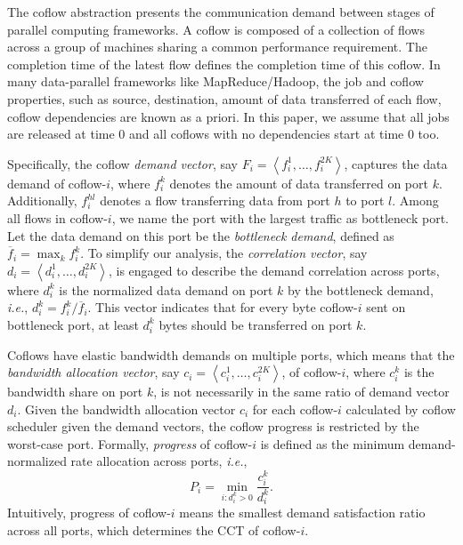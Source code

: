 \documentclass[10pt, conference, letterpaper]{IEEEtran}
\begin{document}
The coflow abstraction presents the communication demand between stages of parallel computing frameworks. A coflow is composed of a collection of flows across a group of machines sharing a common performance requirement. The completion time of the latest flow defines the completion time of this coflow. In many data-parallel frameworks like MapReduce/Hadoop, the job and coflow properties, such as source, destination, amount of data transferred of each flow, coflow dependencies are known as a priori\cite{varys, aalo, bingchuan}. In this paper, we assume that all jobs are released at time 0 and all coflows with no dependencies start at time 0 too.

Specifically, the coflow \emph{demand vector}, say $F_i = \left\langle f_i^1,\dots,f_i^{2K}\right\rangle$, captures the data demand of coflow-$i$, where $f_i^k$ denotes the amount of data transferred on port $k$. Additionally, $f_i^{hl}$ denotes a flow transferring data from port $h$ to port $l$. Among all flows in coflow-$i$, we name the port with the largest traffic as bottleneck port. Let the data demand on this port be the \emph{bottleneck demand}, defined as $\overline{f}_i=\max_{k} f_i^k$. To simplify our analysis, the \emph{correlation vector}, say $d_i = \left\langle d_i^1,\dots,d_i^{2K}\right\rangle$, is engaged to describe the demand correlation across ports, where $d_i^k$ is the normalized data demand on port $k$ by the bottleneck demand, \emph{i.e.}, $d_i^k = f_i^k/\overline{f}_i$. This vector indicates that for every byte coflow-$i$ sent on bottleneck port, at least $d_i^k$ bytes should be transferred on port $k$.

Coflows have elastic bandwidth demands on multiple ports, which means that the \emph{bandwidth allocation vector}, say $c_i=\left\langle c_i^1,\dots,c_i^{2K}\right\rangle$, of coflow-$i$, where $c_i^k$ is the bandwidth share on port $k$, is not necessarily in the same ratio of demand vector $d_i$. Given the bandwidth allocation vector $c_i$ for each coflow-$i$ calculated by coflow scheduler given the demand vectors, the coflow progress is restricted by the worst-case port. Formally, \emph{progress} of coflow-$i$ is defined as the minimum demand-normalized rate allocation across ports, \emph{i.e.},
 \begin{equation}
 	P_i = \min\limits_{i:d_i^k>0}\frac{c_i^k}{d_i^k}.
 \end{equation}
 Intuitively, progress of coflow-$i$ means the smallest demand satisfaction ratio across all ports, which determines the CCT of coflow-$i$.
\end{document}

